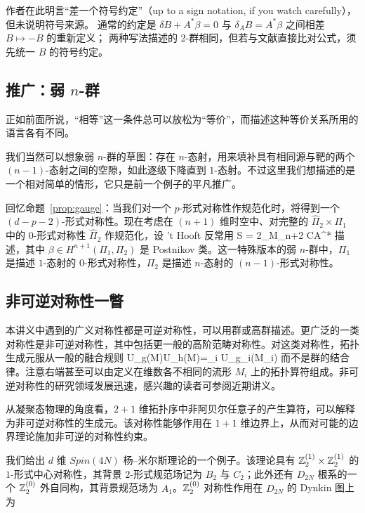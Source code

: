 \begin{yizhu}[原文疑误]
作者在此明言“差一个符号约定”（up to a sign notation, if you watch carefully），但未说明符号来源。
通常的约定是 $\delta B + A^*\beta = 0$ 与 $\delta_A B = A^*\beta$ 之间相差 $B\mapsto -B$ 的重新定义；
两种写法描述的 2-群相同，但若与文献直接比对公式，须先统一 $B$ 的符号约定。
\end{yizhu}

\subsection{推广：弱 $n$-群}
\label{sec:n-group}
正如前面所说，“相等”这一条件总可以放松为“等价”，而描述这种等价关系所用的语言各有不同。

我们当然可以想象弱 $n$-群的草图：存在 $n$-态射，用来填补具有相同源与靶的两个 $(n-1)$-态射之间的空隙，如此逐级下降直到 $1$-态射。不过这里我们想描述的是一个相对简单的情形，它只是前一个例子的平凡推广。

回忆命题~\ref{prop:gauge}：当我们对一个 $p$-形式对称性作规范化时，将得到一个 $(d-p-2)$-形式对称性。现在考虑在 $(n+1)$ 维时空中、对完整的 $\hat{\Pi}_2\times \Pi_1$ 中的 $0$-形式对称性 $\hat{\Pi}_2$ 作规范化，设 't Hooft 反常用
\be  S = 2\pi \int_{M_{n+2}} C\cup A^*\beta   \ee
描述，其中 $\beta\in H^{n+1}(\Pi_1,\Pi_2)$ 是 Postnikov 类。这一特殊版本的弱 $n$-群中，$\Pi_1$ 是描述 $1$-态射的 $0$-形式对称性，$\Pi_2$ 是描述 $n$-态射的 $(n-1)$-形式对称性。

\subsection{非可逆对称性一瞥}
\label{sec:non-invertible}
本讲义中遇到的广义对称性都是可逆对称性，可以用群或高群描述。更广泛的一类对称性是非可逆对称性，其中包括更一般的高阶范畴对称性。对这类对称性，拓扑生成元服从一般的融合规则
\be
U_g(M)U_h(M)=\sum_i U_{g_i}(M_i)
\ee
而不是群的结合律。注意右端甚至可以由定义在维数各不相同的流形 $M_i$ 上的拓扑算符组成。非可逆对称性的研究领域发展迅速，感兴趣的读者可参阅近期讲义\cite{Schafer-Nameki:2023jdn}。

从凝聚态物理的角度看，$2+1$ 维拓扑序中非阿贝尔任意子的产生算符，可以解释为非可逆对称性的生成元。该对称性能够作用在 $1+1$ 维边界上，从而对可能的边界理论施加非可逆的对称性约束\cite{PhysRevResearch.2.043086,kong_mathematical_2020,kong_mathematical_2021,PhysRevResearch.2.033417,ji2022unified,PhysRevB.107.155136,PhysRevB.108.075105}。

我们给出 $d$ 维 $Spin(4N)$ 杨–米尔斯理论的一个例子\cite{Bhardwaj:2022yxj}。该理论具有 $\mathbb{Z}_2^{(1)}\times\mathbb{Z}_2^{(1)}$ 的 $1$-形式中心对称性，其背景 $2$-形式规范场记为 $B_2$ 与 $C_2$；此外还有 $D_{2N}$ 根系的一个 $\mathbb{Z}_2^{(0)}$ 外自同构，其背景规范场为 $A_1$。$\mathbb{Z}_2^{(0)}$ 对称性作用在 $D_{2N}$ 的 Dynkin 图上为

